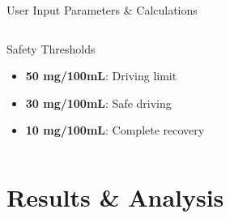 \documentclass[aspectratio=169,14pt]{beamer}
\newcommand{\safety}[1]{\textcolor{safety_green}{\textbf{#1}}}
\newcommand{\warning}[1]{\textcolor{warning_red}{\textbf{#1}}}
\begin{document}
\begin{frame}{User Input Parameters \& Calculations}
\begin{columns}
\begin{column}{0.5\textwidth}
            \begin{block}{Safety Thresholds}
                \begin{itemize}
                    \item \warning{50 mg/100mL}: Driving limit
                    \item \safety{30 mg/100mL}: Safe driving
                    \item \safety{10 mg/100mL}: Complete recovery                \end{itemize}
            \end{block}
        \end{column}
    \end{columns}
\end{frame}

\section{Results \& Analysis}
\end{document}
